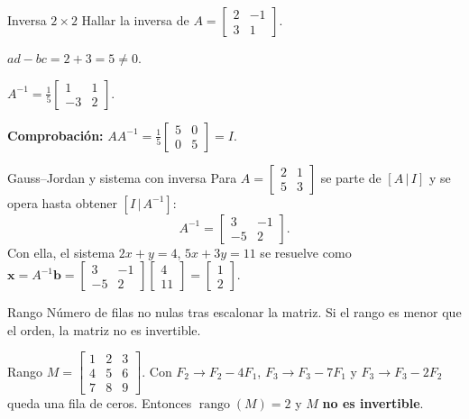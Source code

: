 \begin{tmejemplo}{Inversa $2\times2$}
Hallar la inversa de $A=\begin{bmatrix}2&-1\\3&1\end{bmatrix}$.
\begin{tmpasos}
\item $ad-bc=2+3=5\neq0$.
\item $A^{-1}=\frac15\begin{bmatrix}1&1\\-3&2\end{bmatrix}$.
\item \textbf{Comprobaci\'on:} $AA^{-1}=\frac15\begin{bmatrix}5&0\\0&5\end{bmatrix}=I$.
\end{tmpasos}
\end{tmejemplo}

\begin{tmejemplo}{Gauss--Jordan y sistema con inversa}
Para $A=\begin{bmatrix}2&1\\5&3\end{bmatrix}$ se parte de $[A\,|\,I]$ y se opera hasta obtener $[I\,|\,A^{-1}]$:
\[A^{-1}=\begin{bmatrix}3&-1\\-5&2\end{bmatrix}.\]
Con ella, el sistema $2x+y=4$, $5x+3y=11$ se resuelve como $\mathbf{x}=A^{-1}\mathbf{b}=\begin{bmatrix}3&-1\\-5&2\end{bmatrix}\begin{bmatrix}4\\11\end{bmatrix}=\begin{bmatrix}1\\2\end{bmatrix}$.
\end{tmejemplo}

\begin{tmdef}{Rango}
N\'umero de filas no nulas tras escalonar la matriz. Si el rango es menor que el orden, la matriz no es invertible.
\end{tmdef}

\begin{tmejemplo}{Rango}
$M=\begin{bmatrix}1&2&3\\4&5&6\\7&8&9\end{bmatrix}$. Con $F_2\to F_2-4F_1$, $F_3\to F_3-7F_1$ y $F_3\to F_3-2F_2$ queda una fila de ceros. Entonces $\operatorname{rango}(M)=2$ y $M$ \textbf{no es invertible}.
\end{tmejemplo}

